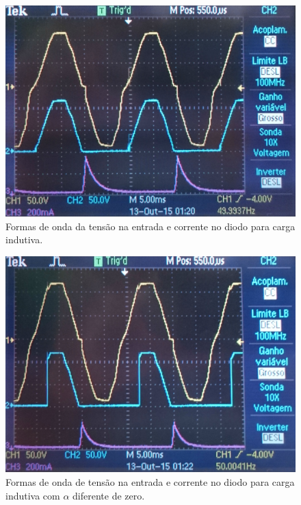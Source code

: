 \documentclass[a4paper,11pt]{article}
\numberwithin{equation}{section}
\begin{document}
\begin{figure}[h]
	\centering
	\includegraphics[keepaspectratio=true, scale=0.11]{img/figs/diodo_alfa_zero}
	\caption{Formas de onda da tensão na entrada e corrente no diodo para carga indutiva.}
	\label{fig:diodo_alfa_zero}
	\vspace{-0.8em}
\end{figure}

\begin{figure}[h]
	\centering
	\includegraphics[keepaspectratio=true, scale=0.43]{img/figs/diodo_alfa_dif_zero}
	\caption{Formas de onda de tensão na entrada e corrente no diodo para carga indutiva com $\alpha$ diferente de zero.}
	\label{fig:diodo_alfa_dif_zero}
	\vspace{-0.8em}
\end{figure}
\end{document}
